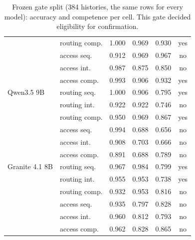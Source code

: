 \begin{table}[t]
\begin{tabular}{@{}llcccc@{}}
 & routing comp. & 1.000 & 0.969 & 0.930 & yes \\
 & access seq. & 0.912 & 0.969 & 0.967 & no \\
 & access int. & 0.987 & 0.875 & 0.850 & no \\
 & access comp. & 0.993 & 0.906 & 0.932 & yes \\
\midrule
Qwen3.5 9B & routing seq. & 1.000 & 0.906 & 0.795 & yes \\
 & routing int. & 0.922 & 0.922 & 0.746 & no \\
 & routing comp. & 0.950 & 0.969 & 0.867 & yes \\
 & access seq. & 0.994 & 0.688 & 0.656 & no \\
 & access int. & 0.908 & 0.703 & 0.666 & no \\
 & access comp. & 0.891 & 0.688 & 0.789 & no \\
\midrule
Granite 4.1 8B & routing seq. & 0.967 & 0.984 & 0.799 & yes \\
 & routing int. & 0.955 & 0.953 & 0.738 & yes \\
 & routing comp. & 0.932 & 0.953 & 0.816 & no \\
 & access seq. & 0.935 & 0.797 & 0.828 & no \\
 & access int. & 0.960 & 0.812 & 0.793 & no \\
 & access comp. & 0.962 & 0.828 & 0.865 & no \\
\bottomrule
\end{tabular}
\caption{Frozen gate split (384 histories, the same rows for every model): accuracy and competence per cell. This gate decided eligibility for confirmation.}
\label{tab:models-gate}
\end{table}
